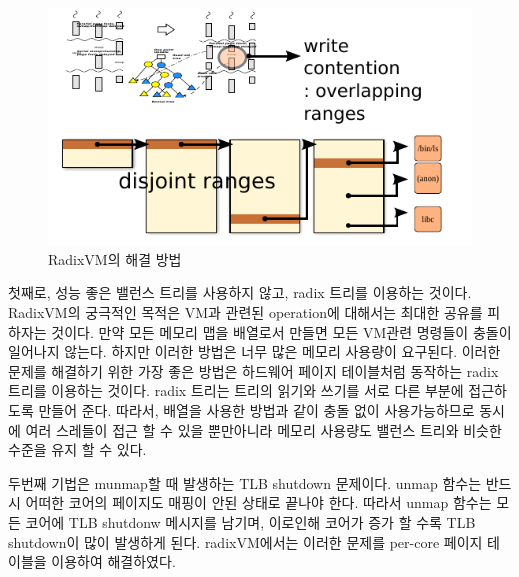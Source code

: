   
\begin{figure}[h!]
    \centering
    \includegraphics[width=1\textwidth]{fig/radix/radix}
    \caption{RadixVM의 해결 방법}
  \label{fig:radix}
\end{figure}


첫째로, 성능 좋은 밸런스 트리를 사용하지 않고, radix 트리를 이용하는 것이다. 
RadixVM의 궁극적인 목적은 VM과 관련된 operation에 대해서는 최대한 공유를 피하자는 것이다.
만약 모든 메모리 맵을 배열로서 만들면 모든 VM관련 명령들이 충돌이 일어나지 않는다. 
하지만 이러한 방법은 너무 많은 메모리 사용량이 요구된다.
이러한 문제를 해결하기 위한 가장 좋은 방법은 하드웨어 페이지 테이블처럼 동작하는 radix 트리를 
이용하는 것이다. 
radix 트리는 트리의 읽기와 쓰기를 서로 다른 부분에 접근하도록 만들어 준다.
따라서, 배열을 사용한 방법과 같이 충돌 없이 사용가능하므로 동시에 여러 스레들이 접근 할 수 있을 뿐만아니라 
메모리 사용량도 밸런스 트리와 비슷한 수준을 유지 할 수 있다.

두번째 기법은 munmap할 때 발생하는 TLB shutdown 문제이다.
unmap 함수는 반드시 어떠한 코어의 페이지도 매핑이 안된 상태로 끝나야 한다.
따라서 unmap 함수는 모든 코어에 TLB shutdonw 메시지를 남기며, 이로인해 
코어가 증가 할 수록 TLB shutdown이 많이 발생하게 된다. 
radixVM에서는 이러한 문제를 per-core 페이지 테이블을 이용하여 해결하였다. 


